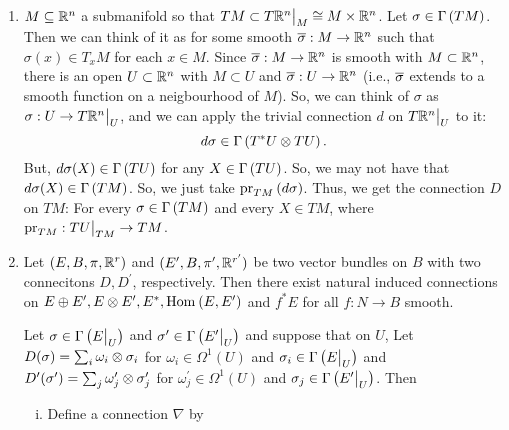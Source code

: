 \documentclass[main.tex]{subfiles}
\begin{document}
\begin{exmp}
    
    \begin{enumerate}
        \item $M \subseteq \mathbb{R}^n$ a submanifold so that $TM \subset T\mathbb{R}^n \big|_{M} \cong M \times \mathbb{R}^n$. Let $\sigma \in \Gamma\left( TM \right)$. Then we can think of it as
         for some smooth $\overline{\sigma} : M \to \mathbb{R}^n$ such that $\sigma(x) \in T_xM$ for each $x \in M$. Since $\overline{\sigma}: M \to \mathbb{R}^n$ is smooth with $M \subset \mathbb{R}^n$, there is an open $U \subset \mathbb{R}^n$ with $M \subset U$ and $\overline{\sigma} : U \to \mathbb{R}^n$ (i.e., $\overline{\sigma}$ extends to a smooth function on a neigbourhood of $M$). So, we can think of $\sigma$ as $\sigma: U \to T\mathbb{R}^n\big|_{U}$, and we can apply the trivial connection $d$ on $T\mathbb{R}^n\big|_{U}$ to it:
        \[
        d\sigma \in \Gamma\left( T^*U \otimes TU \right).
        \]
        But, $d\sigma(X) \in \Gamma\left( TU \right)$  for any $X \in \Gamma\left( TU \right)$. So, we may not have that $d\sigma(X) \in \Gamma\left( TM \right)$. So, we just take $\text{pr}_{TM}\left( d\sigma \right)$. Thus, we get the connection $D$ on $TM$: For every $\sigma \in \Gamma\left( TM \right)$ and every $X \in TM$,
        where $\text{pr}_{TM}: TU\big|_{TM} \to TM$.
        
        \item  Let $(E, B , \pi, \mathbb{R}^r)$ and $(E^\prime, B, \pi^\prime, \mathbb{R}^{r^\prime})$ be two vector bundles on $B$ with two connecitons $D, D^\prime$, respectively. Then there exist natural induced connections on $E \oplus E^\prime, E \otimes E^\prime, E^*, \text{Hom}_{}\left( E, E^\prime \right) $ and $f^*E$ for all $f: N\to B$ smooth. 
        
        Let $\sigma \in \Gamma\left( E\big|_{U} \right)$ and $\sigma^\prime \in \Gamma\left( E^\prime\big|_{U} \right)$ and suppose that on $U$,
        Let $D(\sigma) = \sum_{i} \omega_i \otimes \sigma_i$ for $\omega_i \in \Omega^1(U)$ and $\sigma_i \in \Gamma\left( E\big|_{U} \right)$ and $D^\prime(\sigma^\prime) = \sum_j \omega_j^\prime \otimes \sigma_j^\prime$ for $\omega_j^\prime \in \Omega^1(U)$ and $\sigma_j \in \Gamma\left( E^\prime\big|_{U} \right) $. Then 
        
        \begin{enumerate}[(i)]
            \item {} Define a connection $\nabla$ by 
            

\end{enumerate}
\end{enumerate}
\end{exmp}
\end{document}
